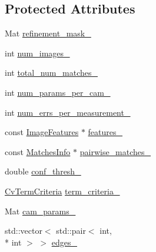 \subsection*{Protected Attributes}
\begin{DoxyCompactItemize}
\item 
Mat \hyperlink{classcv_1_1detail_1_1BundleAdjusterBase_a56ea71911cc8a1693544f2f6a890ba73}{refinement\-\_\-mask\-\_\-}
\item 
int \hyperlink{classcv_1_1detail_1_1BundleAdjusterBase_a195a4414e1e513a21ad1290cafb2c455}{num\-\_\-images\-\_\-}
\item 
int \hyperlink{classcv_1_1detail_1_1BundleAdjusterBase_a4f14cdc846f7f03828c1fb6c21539936}{total\-\_\-num\-\_\-matches\-\_\-}
\item 
int \hyperlink{classcv_1_1detail_1_1BundleAdjusterBase_a53a2fe05702415fbf2926179032c727b}{num\-\_\-params\-\_\-per\-\_\-cam\-\_\-}
\item 
int \hyperlink{classcv_1_1detail_1_1BundleAdjusterBase_a316c5f7ee2a86061f1aab7169aa78bac}{num\-\_\-errs\-\_\-per\-\_\-measurement\-\_\-}
\item 
const \hyperlink{structcv_1_1detail_1_1ImageFeatures}{Image\-Features} $\ast$ \hyperlink{classcv_1_1detail_1_1BundleAdjusterBase_a3e3bcb444b3e4b4bd570653d247c8639}{features\-\_\-}
\item 
const \hyperlink{structcv_1_1detail_1_1MatchesInfo}{Matches\-Info} $\ast$ \hyperlink{classcv_1_1detail_1_1BundleAdjusterBase_a5c6d7027fd93d1824ba811a3c7bbf0a5}{pairwise\-\_\-matches\-\_\-}
\item 
double \hyperlink{classcv_1_1detail_1_1BundleAdjusterBase_a7496b2ad6eb9893b7cf20a723eb4cec7}{conf\-\_\-thresh\-\_\-}
\item 
\hyperlink{structCvTermCriteria}{Cv\-Term\-Criteria} \hyperlink{classcv_1_1detail_1_1BundleAdjusterBase_af4942046f39bdc93ca769b5c29edfe5b}{term\-\_\-criteria\-\_\-}
\item 
Mat \hyperlink{classcv_1_1detail_1_1BundleAdjusterBase_a075f23eff9fafb25b01dc0d909ec308c}{cam\-\_\-params\-\_\-}
\item 
std\-::vector$<$ std\-::pair$<$ int, \\*
int $>$ $>$ \hyperlink{classcv_1_1detail_1_1BundleAdjusterBase_a20d50a47ba95683398d61581dcaac28d}{edges\-\_\-}
\end{DoxyCompactItemize}


